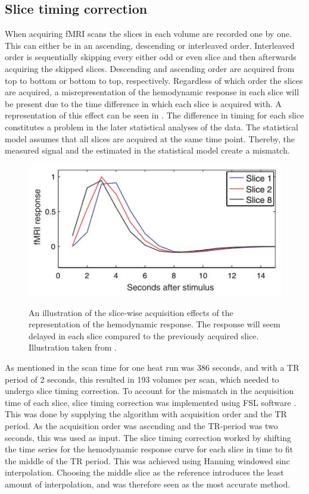 \subsection{Slice timing correction}

When acquiring fMRI scans the slices in each volume are recorded one by one. This can either be in an ascending, descending or interleaved order. Interleaved order is sequentially skipping every either odd or even slice and then afterwards acquiring the skipped slices. Descending and ascending order are acquired from top to bottom or bottom to top, respectively. Regardless of which order the slices are acquired, a misrepresentation of the hemodynamic response in each slice will be present due to the time difference in which each slice is acquired with. A representation of this effect can be seen in . The difference in timing for each slice constitutes a problem in the later statistical analyses of the data. The statistical model assumes that all slices are acquired at the same time point. Thereby, the measured signal and the estimated in the statistical model create a mismatch. \cite{Poldrack2011} \\

\begin{figure}[H] 
	{\includegraphics[width=.65\textwidth]{figures/aBackground/response}}  
	\caption{An illustration of the slice-wise acquisition effects of the representation of the hemodynamic response. The response will seem delayed in each slice compared to the previously acquired slice. Illustration taken from \cite{Poldrack2011}.}
	\label{fig:meth:slice}
\end{figure}

As mentioned in  the scan time for one heat run was 386 seconds, and with a TR period of 2 seconds, this resulted in 193 volumes per scan, which needed to undergo slice timing correction. To account for the mismatch in the acquisition time of each slice, slice timing correction was implemented using FSL software \cite{FMRIB2018}. This was done by supplying the algorithm with acquisition order and the TR period. As the acquisition order was ascending and the TR-period was two seconds, this was used as input. The slice timing correction worked by shifting the time series for the hemodynamic response curve for each slice in time to fit the middle of the TR period. This was achieved using Hanning windowed sinc interpolation. Choosing the middle slice as the reference introduces the least amount of interpolation, and was therefore seen as the most accurate method. \cite{Poldrack2011} 

